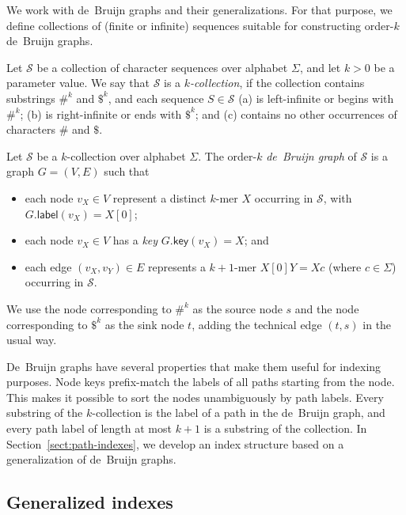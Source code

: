 \documentclass[a4paper,UKenglish]{lipics-v2016}
\newcommand{\glabel}{\ensuremath{\mathsf{label}}}
\newcommand{\gkey}{\ensuremath{\mathsf{key}}}
\newcommand{\kmer}[1]{$#1$\nobreakdash-mer}
\newcommand{\kcollection}[1]{$#1$\nobreakdash-collection}
\newcommand{\orderk}[1]{order\nobreakdash-$#1$}
\begin{document}
We work with de~Bruijn graphs and their generalizations. For that purpose, we define collections of (finite or infinite) sequences suitable for constructing \orderk{k} de~Bruijn graphs.

\begin{definition}[\kcollection{k}]
Let $\mathcal{S}$ be a collection of character sequences over alphabet $\Sigma$, and let $k > 0$ be a parameter value. We say that $\mathcal{S}$ is a \emph{\kcollection{k}}, if the collection contains substrings $\#^{k}$ and $\$^{k}$, and each sequence $S \in \mathcal{S}$
(a) is left-infinite or begins with $\#^{k}$;
(b) is right-infinite or ends with $\$^{k}$; and
(c) contains no other occurrences of characters $\#$ and $\$$.
\end{definition}

\begin{definition}
Let $\mathcal{S}$ be a \kcollection{k} over alphabet $\Sigma$. The \orderk{k} \emph{de~Bruijn graph} of $\mathcal{S}$ is a graph $G = (V, E)$ such that
\begin{itemize}
\item each node $v_{X} \in V$ represent a distinct \kmer{k} $X$ occurring in $\mathcal{S}$, with $G.\glabel(v_{X}) = X[0]$;
\item each node $v_{X} \in V$ has a \emph{key} $G.\gkey(v_{X}) = X$; and
\item each edge $(v_{X}, v_{Y}) \in E$ represents a \kmer{k+1} $X[0]Y = Xc$ (where $c \in \Sigma$) occurring in $\mathcal{S}$.
\end{itemize}
We use the node corresponding to $\#^{k}$ as the source node $s$ and the node corresponding to $\$^{k}$ as the sink node $t$, adding the technical edge $(t, s)$ in the usual way.
\end{definition}

De~Bruijn graphs have several properties that make them useful for indexing purposes. Node keys prefix-match the labels of all paths starting from the node. This makes it possible to sort the nodes unambiguously by path labels. Every substring of the \kcollection{k} is the label of a path in the de~Bruijn graph, and every path label of length at most $k+1$ is a substring of the collection. In Section~\ref{sect:path-indexes}, we develop an index structure based on a generalization of de~Bruijn graphs.

\subsection{Generalized indexes}
\end{document}
